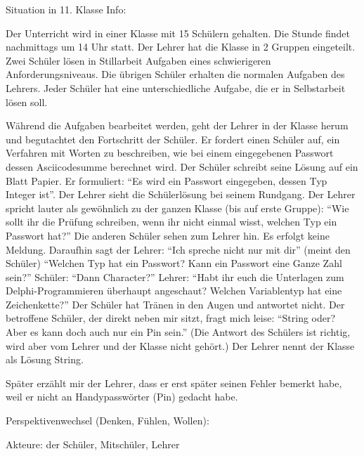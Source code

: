 \documentclass[12pt]{scrartcl}
\begin{document}
Situation in 11. Klasse Info:

Der Unterricht wird in einer Klasse mit 15 Schülern gehalten. Die Stunde findet nachmittags um 14 Uhr statt. Der Lehrer hat die Klasse in 2 Gruppen eingeteilt. Zwei Schüler lösen in Stillarbeit Aufgaben eines schwierigeren Anforderungsniveaus. Die übrigen Schüler erhalten die normalen Aufgaben des Lehrers. Jeder Schüler hat eine unterschiedliche Aufgabe, die er in Selbstarbeit lösen soll.

Während die Aufgaben bearbeitet werden, geht der Lehrer in der Klasse herum und begutachtet den Fortschritt der Schüler. Er fordert einen Schüler auf, ein Verfahren mit Worten zu beschreiben, wie bei einem eingegebenen Passwort dessen Asciicodesumme berechnet wird.
Der Schüler schreibt seine Lösung auf ein Blatt Papier. Er formuliert:  \enquote{Es wird ein Passwort eingegeben, dessen Typ Integer ist}.
Der Lehrer sieht die Schülerlösung bei seinem Rundgang.
Der Lehrer spricht lauter als gewöhnlich zu der ganzen Klasse (bis auf erste Gruppe): \enquote{Wie sollt ihr die Prüfung schreiben, wenn ihr nicht einmal wisst, welchen Typ ein Passwort hat?} Die anderen Schüler sehen zum Lehrer hin. Es erfolgt keine Meldung. Daraufhin sagt der Lehrer: \enquote{Ich spreche nicht nur mit dir} (meint den Schüler)
\enquote{Welchen Typ hat ein Passwort? Kann ein Passwort eine Ganze Zahl sein?} Schüler: \enquote{Dann Character?} Lehrer: \enquote{Habt ihr euch die Unterlagen zum Delphi-Programmieren überhaupt angeschaut? Welchen Variablentyp hat eine Zeichenkette?} Der Schüler hat Tränen in den Augen und antwortet nicht.
Der betroffene Schüler, der direkt neben mir sitzt, fragt mich leise: \enquote{String oder? Aber es kann doch auch nur ein Pin sein.} (Die Antwort des Schülers ist richtig, wird aber vom Lehrer und der Klasse nicht gehört.) Der Lehrer nennt der Klasse als Lösung String.

Später erzählt mir der Lehrer, dass er erst später seinen Fehler bemerkt habe, weil er nicht an Handypasswörter (Pin) gedacht habe.


Perspektivenwechsel (Denken, Fühlen, Wollen):

Akteure: der Schüler, Mitschüler, Lehrer
\end{document}
